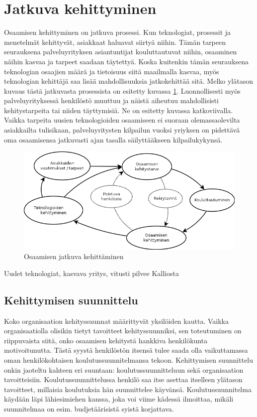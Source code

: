 \documentclass[a4paper,finnish,12pt]{article}
\begin{document}
\clearpage

\section{Jatkuva kehittyminen}

Osaamisen kehittyminen on jatkuva prosessi. Kun teknologiat, prosessit ja menetelmät kehittyvät, asiakkaat haluavat siirtyä niihin. Tämän tarpeen seurauksena palveluyrityksen asiantuntijat kouluttautuvat niihin, osaaminen näihin kasvaa ja tarpeet saadaan täytettyä. Koska kuitenkin tämän seurauksena teknologian osaajien määrä ja tietoisuus siitä maailmalla kasvaa, myös teknologian kehittäjä saa lisää mahdollisuuksia jatkokehittää sitä. Melko ylätason kuvaus tästä jatkuvasta prosessista on esitetty kuvassa \ref{fig:perusympyra}. Luonnollisesti myös palveluyrityksessä henkilöstö muuttuu ja näistä aiheutuu mahdollisisti kehitystarpeita tai niiden täyttymisiä. Ne on esitetty kuvassa katkoviivalla. Vaikka tarpeita uusien teknologioiden osaamiseen ei suoraan olemassaolevilta asiakkailta tulisikaan, palveluyritysten kilpailun vuoksi yriyksen on pidettävä oma osaamisensa jatkuvasti ajan tasalla säilyttääkseen kilpailukykynsä.

\begin{figure}[ht]
\centering
\includegraphics[scale=0.5]{knowledge_circle.png}
\caption{Osaamisen jatkuva kehittäminen}
\label{fig:perusympyra}
\end{figure}

Uudet teknologiat, kasvava yritys, vitusti pilvee Kalliosta

\subsection{Kehittymisen suunnittelu}

Koko organisaation kehityssuunnat määrittyvät yksilöiden kautta. Vaikka organisaatiolla olisikin tietyt tavoitteet kehityssuunniksi, sen toteutuminen on riippuvaista siitä, onko osaamisen kehitystä hankkiva henkilökunta motivoitunutta. Tästä syystä henkilöstön itsensä tulee saada olla vaikuttamassa oman henkilökohtaisen koulutussuunnitelmansa tekoon. Kehittymisen suunnittelu onkin jaoteltu kahteen eri suuntaan: koulutussuunnitteluun sekä organisaation tavoitteisiin. Koulutussuunnittelussa henkilö saa itse asettaa itselleen ylätason tavoitteet, millaisia koulutuksia hän suunnittelee käyvänsä. Koulutussuunnitelma käydään läpi lähiesimiehen kanssa, joka voi viime kädessä ilmoittaa, mikäli suunnitelmaa on esim. budjetäärisistä syistä korjattava.
\end{document}
